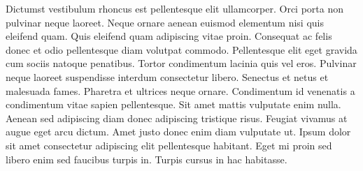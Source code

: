 Dictumst vestibulum rhoncus est pellentesque elit ullamcorper. Orci porta non pulvinar neque laoreet. Neque ornare aenean euismod elementum nisi quis eleifend quam. Quis eleifend quam adipiscing vitae proin. Consequat ac felis donec et odio pellentesque diam volutpat commodo. Pellentesque elit eget gravida cum sociis natoque penatibus. Tortor condimentum lacinia quis vel eros. Pulvinar neque laoreet suspendisse interdum consectetur libero. Senectus et netus et malesuada fames. Pharetra et ultrices neque ornare. Condimentum id venenatis a condimentum vitae sapien pellentesque. Sit amet mattis vulputate enim nulla. Aenean sed adipiscing diam donec adipiscing tristique risus. Feugiat vivamus at augue eget arcu dictum. Amet justo donec enim diam vulputate ut. Ipsum dolor sit amet consectetur adipiscing elit pellentesque habitant. Eget mi proin sed libero enim sed faucibus turpis in. Turpis cursus in hac habitasse.

